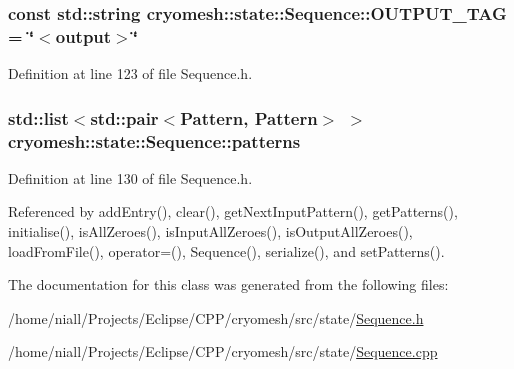 \hypertarget{classcryomesh_1_1state_1_1Sequence_a3aaf7140b264dc19f04080e8b064814f}{
\subsubsection[{\-O\-U\-T\-P\-U\-T\-\_\-\-T\-A\-G}]{\setlength{\rightskip}{0pt plus 5cm}const std\-::string {\bf cryomesh\-::state\-::\-Sequence\-::\-O\-U\-T\-P\-U\-T\-\_\-\-T\-A\-G} = \char`\"{}$<$output$>$\char`\"{}}}\label{classcryomesh_1_1state_1_1Sequence_a3aaf7140b264dc19f04080e8b064814f}


\-Definition at line 123 of file \-Sequence.\-h.

\hypertarget{classcryomesh_1_1state_1_1Sequence_ac01e916df7df88124c2c1f6562ae8d4a}{
\subsubsection[{patterns}]{\setlength{\rightskip}{0pt plus 5cm}std\-::list$<$std\-::pair$<${\bf \-Pattern}, {\bf \-Pattern}$>$ $>$ {\bf cryomesh\-::state\-::\-Sequence\-::patterns}}}\label{classcryomesh_1_1state_1_1Sequence_ac01e916df7df88124c2c1f6562ae8d4a}


\-Definition at line 130 of file \-Sequence.\-h.



\-Referenced by add\-Entry(), clear(), get\-Next\-Input\-Pattern(), get\-Patterns(), initialise(), is\-All\-Zeroes(), is\-Input\-All\-Zeroes(), is\-Output\-All\-Zeroes(), load\-From\-File(), operator=(), \-Sequence(), serialize(), and set\-Patterns().



\-The documentation for this class was generated from the following files\-:\begin{DoxyCompactItemize}
\item 
/home/niall/\-Projects/\-Eclipse/\-C\-P\-P/cryomesh/src/state/\hyperlink{Sequence_8h}{\-Sequence.\-h}\item 
/home/niall/\-Projects/\-Eclipse/\-C\-P\-P/cryomesh/src/state/\hyperlink{Sequence_8cpp}{\-Sequence.\-cpp}\end{DoxyCompactItemize}
